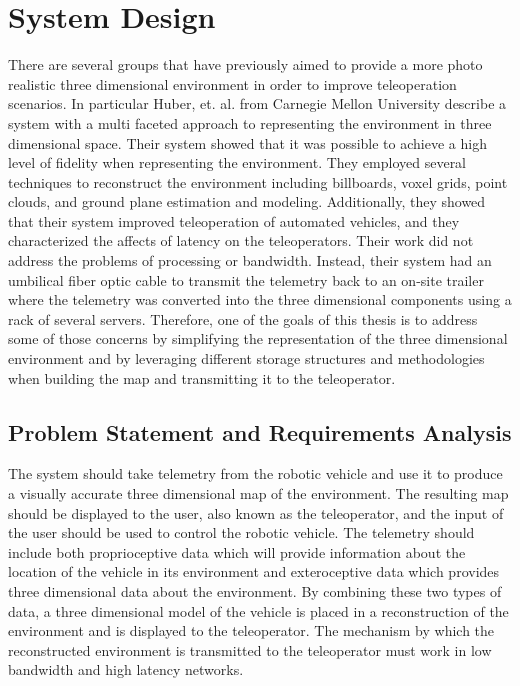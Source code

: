 \documentclass[12pt]{report}
\begin{document}

\chapter{System Design}\label{chap:system_design}
There are several groups that have previously aimed to provide a more photo realistic three dimensional environment in order to improve teleoperation scenarios.  In particular Huber, et. al. from Carnegie Mellon University describe a system with a multi faceted approach to representing the environment in three dimensional space\cite{photo_real}.  Their system showed that it was possible to achieve a high level of fidelity when representing the environment.  They employed several techniques to reconstruct the environment including billboards, voxel grids, point clouds, and ground plane estimation and modeling.  Additionally, they showed that their system improved teleoperation of automated vehicles, and they characterized the affects of latency on the teleoperators.  Their work did not address the problems of processing or bandwidth.  Instead, their system had an umbilical fiber optic cable to transmit the telemetry back to an on-site trailer where the telemetry was converted into the three dimensional components using a rack of several servers.  Therefore, one of the goals of this thesis is to address some of those concerns by simplifying the representation of the three dimensional environment and by leveraging different storage structures and methodologies when building the map and transmitting it to the teleoperator.

\section{Problem Statement and Requirements Analysis}
The system should take telemetry from the robotic vehicle and use it to produce a visually accurate three dimensional map of the environment.  The resulting map should be displayed to the user, also known as the teleoperator, and the input of the user should be used to control the robotic vehicle.  The telemetry should include both proprioceptive data which will provide information about the location of the vehicle in its environment and exteroceptive data which provides three dimensional data about the environment.  By combining these two types of data, a three dimensional model of the vehicle is placed in a reconstruction of the environment and is displayed to the teleoperator.  The mechanism by which the reconstructed environment is transmitted to the teleoperator must work in low bandwidth and high latency networks.
\end{document}

